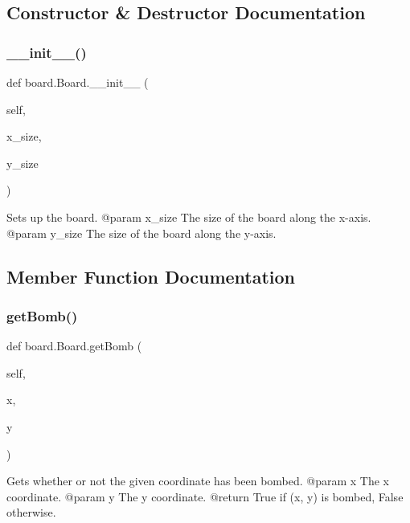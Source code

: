 \subsection{Constructor \& Destructor Documentation}
\mbox{\label{classboard_1_1_board_a9a83d6d877f51e6d7b6a30c2b17cf321}} 
\subsubsection{\texorpdfstring{\_\_init\_\_()}{\_\_init\_\_()}}
{\footnotesize\ttfamily def board.\+Board.\+\_\+\+\_\+init\+\_\+\+\_\+ (\begin{DoxyParamCaption}\item[{}]{self,  }\item[{}]{x\+\_\+size,  }\item[{}]{y\+\_\+size }\end{DoxyParamCaption})}

\begin{DoxyVerb}Sets up the board.
@param x_size The size of the board along the x-axis.
@param y_size The size of the board along the y-axis.
\end{DoxyVerb}
 

\subsection{Member Function Documentation}
\mbox{\label{classboard_1_1_board_ab8f21f26a453a5ef383a0dc91256a598}} 
\subsubsection{\texorpdfstring{getBomb()}{getBomb()}}
{\footnotesize\ttfamily def board.\+Board.\+get\+Bomb (\begin{DoxyParamCaption}\item[{}]{self,  }\item[{}]{x,  }\item[{}]{y }\end{DoxyParamCaption})}

\begin{DoxyVerb}Gets whether or not the given coordinate has been bombed.
@param x The x coordinate.
@param y The y coordinate.
@return True if (x, y) is bombed, False otherwise.
\end{DoxyVerb}
 \mbox{\label{classboard_1_1_board_a06cacb801d5880d3267ed1aea0486072}} 
